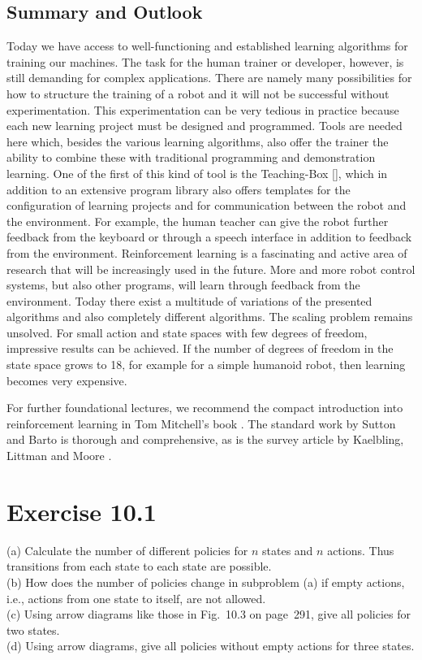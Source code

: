 \documentclass[10pt]{book}
\begin{document}
\subsection{Summary and Outlook}
Today we have access to well-functioning and established learning algorithms for training our machines. The task for the human trainer or developer, however, is still demanding for complex applications. There are namely many possibilities for how to structure the training of a robot and it will not be successful without experimentation. This experimentation can be very tedious in practice because each new learning project must be designed and programmed. Tools are needed here which, besides the various learning algorithms, also offer the trainer the ability to combine these with traditional programming and demonstration learning. One of the first of this kind of tool is the Teaching-Box [\cite{ertel2009teachingbox}], which in addition to an extensive program library also offers templates for the configuration of learning projects and for communication between the robot and the environment. For example, the human teacher can give the robot further feedback from the keyboard or through a speech interface in addition to feedback from the environment.
Reinforcement learning is a fascinating and active area of research that will be increasingly used in the future. More and more robot control systems, but also other programs, will learn through feedback from the environment. Today there exist a multitude of variations of the presented algorithms and also completely different algorithms. The scaling problem remains unsolved. For small action and state spaces with few degrees of freedom, impressive results can be achieved. If the number of degrees of freedom in the state space grows to 18, for example for a simple humanoid robot, then learning becomes very expensive.

For further foundational lectures, we recommend the compact introduction into reinforcement learning in Tom Mitchell's book \cite{Mit97}. The standard work by Sutton and Barto \cite{SB98} is thorough and comprehensive, as is the survey article by Kaelbling, Littman and Moore \cite{kaelbling1996survey}.

\section{Exercise 10.1}
(a) Calculate the number of different policies for $n$ states and $n$ actions. Thus transitions from each state to each state are possible.\\
(b) How does the number of policies change in subproblem (a) if empty actions, i.e., actions from one state to itself, are not allowed.\\
(c) Using arrow diagrams like those in Fig.~10.3 on page~291, give all policies for two states.\\
(d) Using arrow diagrams, give all policies without empty actions for three states.
\end{document}
